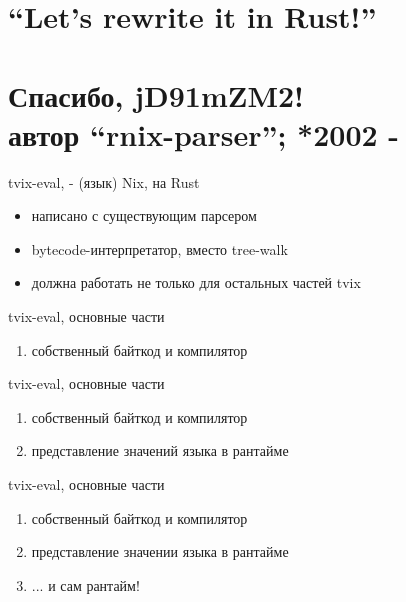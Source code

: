 \documentclass[12pt]{beamer}
\begin{document}
  \section{``Let's rewrite it in Rust!''}

  \section*{Спасибо, jD91mZM2!\\\normalsize{автор ``rnix-parser''; *2002 - }}

  \begin{frame}{tvix-eval, - (язык) Nix, на Rust}
    \begin{itemize}
    \item написано с существующим парсером
    \item bytecode-интерпретатор, вместо tree-walk
    \item должна работать не только для остальных частей tvix
    \end{itemize}
  \end{frame}

  \begin{frame}{tvix-eval, основные части}
    \begin{enumerate}
    \item собственный байткод и компилятор
    \end{enumerate}
  \end{frame}


  \begin{frame}{tvix-eval, основные части}
    \begin{enumerate}
    \item собственный байткод и компилятор
    \item представление значений языка в рантайме
    \end{enumerate}
  \end{frame}


  \begin{frame}{tvix-eval, основные части}
    \begin{enumerate}
    \item собственный байткод и компилятор
    \item представление значении языка в рантайме
    \item ... и сам рантайм!
    \end{enumerate}
  \end{frame}
\end{document}
